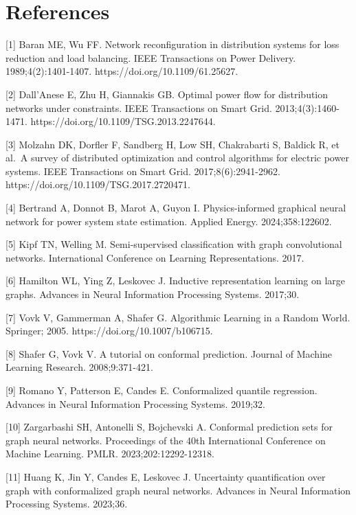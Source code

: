 \documentclass[
  preprint,12pt]{elsarticle}
\begin{document}
\section*{References}\label{references}

{[}1{]} Baran ME, Wu FF. Network reconfiguration in distribution systems
for loss reduction and load balancing. IEEE Transactions on Power
Delivery. 1989;4(2):1401-1407. https://doi.org/10.1109/61.25627.

{[}2{]} Dall'Anese E, Zhu H, Giannakis GB. Optimal power flow for
distribution networks under constraints. IEEE Transactions on Smart
Grid. 2013;4(3):1460-1471. https://doi.org/10.1109/TSG.2013.2247644.

{[}3{]} Molzahn DK, Dorfler F, Sandberg H, Low SH, Chakrabarti S,
Baldick R, et al.~A survey of distributed optimization and control
algorithms for electric power systems. IEEE Transactions on Smart Grid.
2017;8(6):2941-2962. https://doi.org/10.1109/TSG.2017.2720471.

{[}4{]} Bertrand A, Donnot B, Marot A, Guyon I. Physics-informed
graphical neural network for power system state estimation. Applied
Energy. 2024;358:122602.

{[}5{]} Kipf TN, Welling M. Semi-supervised classification with graph
convolutional networks. International Conference on Learning
Representations. 2017.

{[}6{]} Hamilton WL, Ying Z, Leskovec J. Inductive representation
learning on large graphs. Advances in Neural Information Processing
Systems. 2017;30.

{[}7{]} Vovk V, Gammerman A, Shafer G. Algorithmic Learning in a Random
World. Springer; 2005. https://doi.org/10.1007/b106715.

{[}8{]} Shafer G, Vovk V. A tutorial on conformal prediction. Journal of
Machine Learning Research. 2008;9:371-421.

{[}9{]} Romano Y, Patterson E, Candes E. Conformalized quantile
regression. Advances in Neural Information Processing Systems. 2019;32.

{[}10{]} Zargarbashi SH, Antonelli S, Bojchevski A. Conformal prediction
sets for graph neural networks. Proceedings of the 40th International
Conference on Machine Learning. PMLR. 2023;202:12292-12318.

{[}11{]} Huang K, Jin Y, Candes E, Leskovec J. Uncertainty
quantification over graph with conformalized graph neural networks.
Advances in Neural Information Processing Systems. 2023;36.
\end{document}
